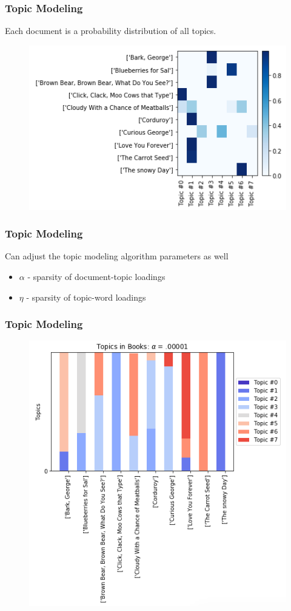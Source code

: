 \documentclass{beamer}
\begin{document}
\begin{frame}
	\frametitle{Topic Modeling}
	Each document is a probability distribution of all topics.
	\begin{figure}
		\includegraphics[width=0.9\linewidth]{ldaheatmap.png}
	\end{figure}
\end{frame}
\begin{frame}
	\frametitle{Topic Modeling}
	Can adjust the topic modeling algorithm parameters as well
	\begin{itemize}
		\item $\alpha$ - sparsity of document-topic loadings
		\item $\eta$ - sparsity of topic-word loadings
	\end{itemize}
\end{frame}
\begin{frame}
	\frametitle{Topic Modeling}
	\begin{figure}
		\includegraphics[width=.64\linewidth]{lowalpha.png}
	\end{figure}
\end{frame}
\end{document}
